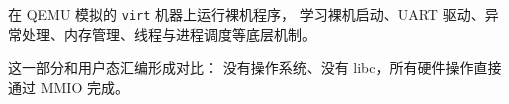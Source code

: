 在 QEMU 模拟的 \texttt{virt} 机器上运行裸机程序，
学习裸机启动、UART 驱动、异常处理、内存管理、线程与进程调度等底层机制。

这一部分和用户态汇编形成对比：
没有操作系统、没有 libc，所有硬件操作直接通过 MMIO 完成。
